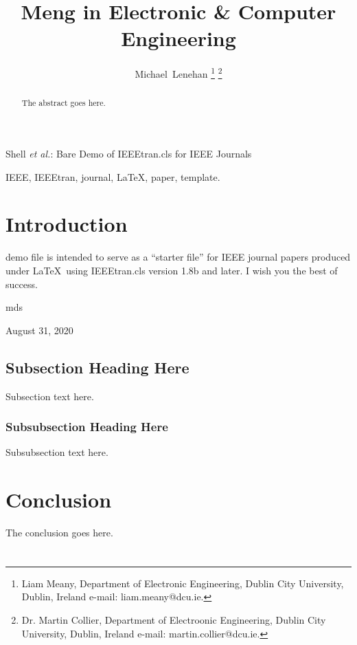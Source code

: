 \documentclass[a4paper,journal]{IEEEtran}
\begin{document}
\title{Meng in Electronic \& Computer Engineering}
\author{Michael~Lenehan%
\thanks{Liam Meany, Department
of Electronic Engineering, Dublin City University, Dublin,
Ireland e-mail: liam.meany@dcu.ie.}%
\thanks{Dr. Martin Collier, Department
of Electroonic Engineering, Dublin City University, Dublin,
Ireland e-mail: martin.collier@dcu.ie.}%
}


%
{Shell \MakeLowercase{\textit{et al.}}: Bare Demo of IEEEtran.cls for IEEE Journals}


\maketitle

\begin{abstract}
The abstract goes here.
\end{abstract}

\begin{IEEEkeywords}
IEEE, IEEEtran, journal, \LaTeX, paper, template.
\end{IEEEkeywords}
\section{Introduction}
 demo file is intended to serve as a ``starter file''
for IEEE journal papers produced under \LaTeX\ using
IEEEtran.cls version 1.8b and later.
I wish you the best of success.

\hfill mds

\hfill August 31, 2020

\subsection{Subsection Heading Here}
Subsection text here.


\subsubsection{Subsubsection Heading Here}
Subsubsection text here.

\section{Conclusion}
The conclusion goes here.

\clearpage
\appendices
\section*{}





\printbibliography
\end{document}
